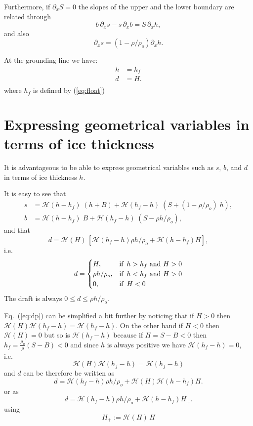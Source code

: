 \documentclass[10pt,a4paper]{book}
\newcommand{\He}{\mathcal{H}}
\newcommand{\p}{\partial}
\begin{document}
Furthermore, if $\p_x S=0$ the slopes of the upper and the lower boundary are related through
\begin{equation}
b \, \p_x s -  s \, \p_x b = S \, \p_x h,
\label{eq:resi}
\end{equation}
and also
\[ \p_x s=(1-\rho/\rho_o) \p_x h .\]

At the grounding line we have:
\begin{align*}
h&=h_f\\
d&=H.\\
\end{align*}
where $h_f$ is defined by (\ref{eq:float})
\section{Expressing geometrical variables in terms of ice thickness}

It is advantageous to be able to express geometrical variables such as $s$, $b$, and $d$ in terms of ice
thickness $h$.  

It is easy to see that
\begin{align}
s&= \He(h-h_f) \; (h+ B) + \He(h_f-h) \; (S+(1-\rho/\rho_o)\; h ) ,\label{eq:sh} \\
b&=\He(h-h_f) \; B + \He(h_f-h) \; (S-\rho h/\rho_o), \label{eq:bh}
\end{align}
and that
\begin{equation}
d= \He(H) \, [ \He(h_f-h) \rho h/\rho_o + \He(h-h_f) H ] ,
\label{eq:dp}
\end{equation}
i.e.\ 
\[
d=\begin{cases} 
H , & \mbox{if } \, h>h_f \mbox{ and } H>0 \\  
\rho h /\rho_o , & \hbox{if } \,  h<h_f \mbox{ and } H>0\\
0 , & \hbox{if } \,  H<0  \
\end{cases}
\]
The draft is always $0\le d \le \rho h /\rho_o $.

Eq.~(\ref{eq:dp}) can be simplified a bit further by noticing that 
if $H>0$ then $\He(H) \He(h_f-h)=\He(h_f-h)$. On the other
hand if $H<0$ then $\He(H)=0$ but so is $\He(h_f-h)$ because if $H=S-B<0$ then 
$h_f=\frac{\rho_o}{\rho}(S-B) < 0$ and since $h$ is always positive we have
$\He(h_f-h)=0$, i.e.\
\[
\He(H) \He(h_f-h)=\He(h_f-h)
\]
and $d$ can be therefore be written as
\begin{equation}
d=  \He(h_f-h) \rho h/\rho_o + \He(H) \He(h-h_f) H .
\label{eq:dp2}
\end{equation}
or as
\begin{equation}
d=  \He(h_f-h) \rho h/\rho_o + \He(h-h_f) H_{+} .
\label{eq:dp3}
\end{equation}
using
\[
H_{+}:= \He(H) \, H
\]
\end{document}
